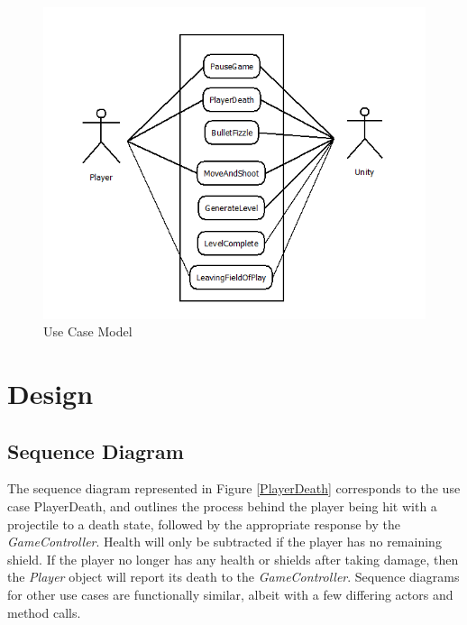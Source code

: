 \documentclass[12pt]{article}       %
\begin{document}
\begin{figure} [H]
\centering
\includegraphics[width=5.5in]{UseCaseModel1.png}
\caption{Use Case Model} \label{Use Case Model}
\end{figure}


\section{Design} %
\label{sec:Design}

\subsection{Sequence Diagram}
The sequence diagram represented in Figure \ref{PlayerDeath}  corresponds to the use case PlayerDeath, and outlines the process behind the player being hit with a projectile to a death state, followed by the appropriate response by the {\it GameController}. Health will only be subtracted if the player has no remaining shield. If the player no longer has any health or shields after taking damage, then the {\it Player} object will report its death to the {\it GameController}. Sequence diagrams for other use cases are functionally similar, albeit with a few differing actors and method calls.
\end{document}
